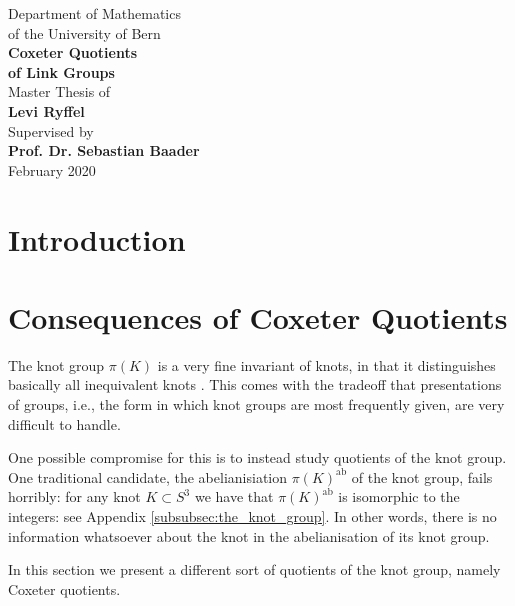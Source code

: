\documentclass[a4paper]{article}
\theoremstyle{definition}
\begin{document}

\begin{titlepage}
\begin{center}
\Large{Department of Mathematics \\ of the University of Bern}\\
\vspace*{3.5cm}
\Huge{\textbf{Coxeter Quotients \\ of Link Groups}}\\
\vspace*{6.5cm}
\Large{Master Thesis of} \\ \Large{\textbf{Levi Ryffel}}\\
\vspace*{.25cm}
Supervised by \\ \textbf{Prof. Dr. Sebastian Baader}\\
\vspace*{2cm}
February 2020
\end{center}
\end{titlepage}

\tableofcontents
\newpage

\section*{Introduction}

\newpage
\section{Consequences of Coxeter Quotients}
The knot group $\pi(K)$ is a very fine invariant of knots, in that it distinguishes basically all inequivalent knots \cite[Corollary 2.1]{gordon1989}. This comes with the tradeoff that presentations of groups, i.e., the form in which knot groups are most frequently given, are very difficult to handle.

One possible compromise for this is to instead study quotients of the knot group. One traditional candidate, the abelianisiation $\pi(K)^{\text{ab}}$ of the knot group, fails horribly: for any knot $K \subset S^3$ we have that $\pi(K)^{\text{ab}}$ is isomorphic to the integers: see Appendix \ref{subsubsec:the_knot_group}. In other words, there is no information whatsoever about the knot in the abelianisation of its knot group.

In this section we present a different sort of quotients of the knot group, namely Coxeter quotients.
\end{document}
